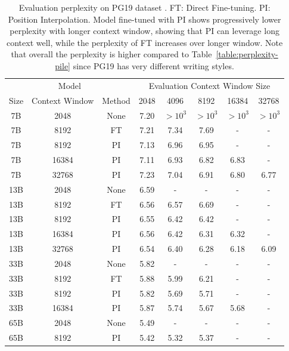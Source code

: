 \documentclass{article} %
\theoremstyle{definition}
\begin{document}
\begin{table}[thbp]
\centering
\begin{tabular}{cccccccc}
\toprule
\multicolumn{3}{c}{Model} & \multicolumn{5}{c}{Evaluation Context Window Size}\\
Size &  Context Window & Method &  2048 & 4096 & 8192 & 16384 & 32768 \\
\midrule
   7B &            2048 &   None &  7.20 &    $>10^3$ &  $>10^3$ &    $>10^3$ &     $>10^3$ \\
   7B &            8192 &     FT &  7.21 & 7.34 & 7.69 &     - &     - \\
\midrule
   7B &            8192 &     PI&  7.13 & 6.96 & 6.95 &     - &     - \\
   7B &           16384 &     PI &  7.11 & 6.93 & 6.82 &  6.83 &     - \\
   7B &           32768 &     PI&  7.23 & 7.04 & 6.91 &  6.80 &  6.77 \\
\midrule
   13B &            2048 &   None &  6.59 &    - &  - &    - &     -\\
   13B &            8192 &     FT &  6.56 & 6.57 & 6.69 &     - &     - \\
\midrule
   13B &            8192 &     PI&  6.55 & 6.42 & 6.42 &     - &     - \\
   13B &           16384 &     PI &  6.56 & 6.42 & 6.31 &  6.32 &     - \\
   13B &           32768 &     PI&  6.54 & 6.40 & 6.28 &  6.18 &  6.09 \\
\midrule
  33B &            2048 &   None &  5.82 &    - &    - &     - &     - \\
  33B &            8192 &     FT &  5.88 & 5.99 & 6.21 &     - &     - \\
\midrule
  33B &            8192 &     PI &  5.82 & 5.69 & 5.71 &     - &     - \\
  33B &           16384 &     PI &  5.87 & 5.74 & 5.67 &  5.68 &     - \\
\midrule
65B & 2048 & None & 5.49 & - & - & - & -\\
\midrule
65B & 8192 & PI & 5.42 & 5.32 & 5.37 & - & - \\  
\bottomrule
\end{tabular}
\caption{\small Evaluation perplexity on PG19 dataset \citep{Rae2020Compressive}. FT: Direct Fine-tuning. PI: Position Interpolation. Model fine-tuned with PI shows progressively lower perplexity with longer context window, showing that PI can leverage long context well, while the perplexity of FT increases over longer window. Note that overall the perplexity is higher compared to Table~\ref{table:perplexity-pile} since PG19 has very different writing styles.}
\label{table:perplexity-pg19}
\end{table}
\end{document}
